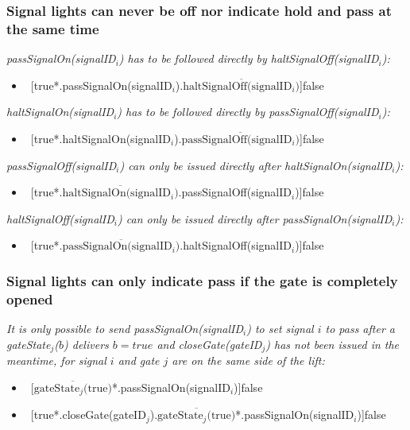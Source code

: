 \subsubsection{Signal lights can never be off nor indicate hold and pass at the same time}
\textit{passSignalOn(signalID$_i$) has to be followed directly by haltSignalOff(signalID$_i$):}
	\begin{itemize}
		\item ~[true*.passSignalOn(signalID$_i$).$\overline{\textrm{haltSignalOff(signalID$_i$)}}$]false
	\end{itemize}
\textit{haltSignalOn(signalID$_i$) has to be followed directly by passSignalOff(signalID$_i$):}
	\begin{itemize}
		\item ~[true*.haltSignalOn(signalID$_i$).$\overline{\textrm{passSignalOff(signalID$_i$)}}$]false
	\end{itemize}
\textit{passSignalOff(signalID$_i$) can only be issued directly after haltSignalOn(signalID$_i$):}
	\begin{itemize}
		\item ~[true*.$\overline{\textrm{haltSignalOn(signalID$_i$)}}$.passSignalOff(signalID$_i$)]false
	\end{itemize}
\textit{haltSignalOff(signalID$_i$) can only be issued directly after passSignalOn(signalID$_i$):}
	\begin{itemize}
		\item ~[true*.$\overline{\textrm{passSignalOn(signalID$_i$)}}$.haltSignalOff(signalID$_i$)]false
	\end{itemize}

\subsubsection{Signal lights can only indicate pass if the gate is completely opened}
\textit{It is only possible to send passSignalOn(signalID$_i$) to set signal $i$ to pass after a gateState$_j$($ b $) delivers $b = true$ and closeGate(gateID$_j$) has not been issued in the meantime, for signal $i$ and gate $j$ are on the same side of the lift:}
	\begin{itemize}
		\item ~[$\overline{\textrm{gateState$_j$(true)}}$*.passSignalOn(signalID$_i$)]false
		\item ~[true*.closeGate(gateID$_j$).$\overline{\textrm{gateState$_j$(true)}}$*.passSignalOn(signalID$_i$)]false
	\end{itemize}
	
